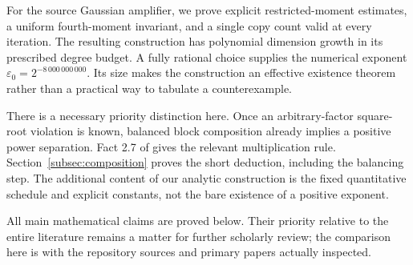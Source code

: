 For the source Gaussian amplifier, we prove explicit restricted-moment
estimates, a uniform fourth-moment invariant, and a single copy count
valid at every iteration. The resulting construction has polynomial
dimension growth in its prescribed degree budget. A fully rational
choice supplies the numerical exponent
\(\varepsilon_0=2^{-8\,000\,000\,000}\).
Its size makes the construction an effective existence theorem rather
than a practical way to tabulate a counterexample.

There is a necessary priority distinction here. Once an arbitrary-factor
square-root violation is known, balanced block composition already
implies a positive power separation. Fact 2.7 of
\cite{BlaisTanWan2015} gives the relevant multiplication rule.
Section~\ref{subsec:composition} proves the short deduction, including
the balancing step. The additional content of our analytic construction
is the fixed quantitative schedule and explicit constants, not the bare
existence of a positive exponent.

All main mathematical claims are proved below. Their priority relative
to the entire literature remains a matter for further scholarly review;
the comparison here is with the repository sources and primary papers
actually inspected.
